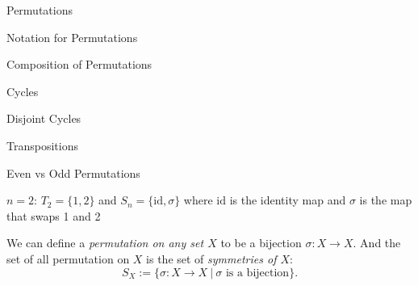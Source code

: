\documentclass[12pt]{article}
\begin{document}
 
	\startdoc
		{
			\item Permutations
			\item Notation for Permutations
			\item Composition of Permutations
			\item Cycles
			\item Disjoint Cycles
			\item Transpositions
			\item Even vs Odd Permutations
		}

	\begin{exa}
		$n=2$:  \quad $T_2=\{1,2\}$ and $S_n=\{\mathrm{id},\sigma\}$ where $\mathrm{id}$ is the identity map and $\sigma$ is the map that swaps 1 and 2
		\begin{center}
			
			\qquad
		\end{center}
	\end{exa}
	\begin{nb}
		We can define a \emph{permutation on any set $X$} to be a bijection $\sigma\colon X\to X$.  And the set of all permutation on $X$ is the set of \emph{symmetries of $X$}:
			\[S_X:=\{\sigma\colon X\to X\ |\ \sigma\text{ is a bijection}\}.\]
	\end{nb}
\newpage
\end{document}
